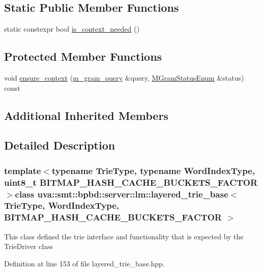 \subsection*{Static Public Member Functions}
\begin{DoxyCompactItemize}
\item 
static constexpr bool \hyperlink{classuva_1_1smt_1_1bpbd_1_1server_1_1lm_1_1layered__trie__base_a0114afe42fa71efd8645b3034f922c47}{is\+\_\+context\+\_\+needed} ()
\end{DoxyCompactItemize}
\subsection*{Protected Member Functions}
\begin{DoxyCompactItemize}
\item 
void \hyperlink{classuva_1_1smt_1_1bpbd_1_1server_1_1lm_1_1layered__trie__base_a1352c82c6bb21483ad2c5acabb0b9d58}{ensure\+\_\+context} (\hyperlink{classuva_1_1smt_1_1bpbd_1_1server_1_1lm_1_1m__gram__query}{m\+\_\+gram\+\_\+query} \&query, \hyperlink{namespaceuva_1_1smt_1_1bpbd_1_1server_1_1lm_ab9b3e7382b561dcb8abcd6b55e9b796a}{M\+Gram\+Status\+Enum} \&status) const 
\end{DoxyCompactItemize}
\subsection*{Additional Inherited Members}


\subsection{Detailed Description}
\subsubsection*{template$<$typename Trie\+Type, typename Word\+Index\+Type, uint8\+\_\+t B\+I\+T\+M\+A\+P\+\_\+\+H\+A\+S\+H\+\_\+\+C\+A\+C\+H\+E\+\_\+\+B\+U\+C\+K\+E\+T\+S\+\_\+\+F\+A\+C\+T\+O\+R$>$class uva\+::smt\+::bpbd\+::server\+::lm\+::layered\+\_\+trie\+\_\+base$<$ Trie\+Type, Word\+Index\+Type, B\+I\+T\+M\+A\+P\+\_\+\+H\+A\+S\+H\+\_\+\+C\+A\+C\+H\+E\+\_\+\+B\+U\+C\+K\+E\+T\+S\+\_\+\+F\+A\+C\+T\+O\+R $>$}

This class defined the trie interface and functionality that is expected by the Trie\+Driver class 

Definition at line 153 of file layered\+\_\+trie\+\_\+base.\+hpp.




